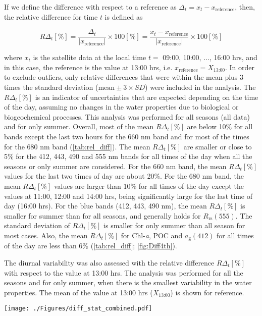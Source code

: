 \documentclass[remotesensing,article,submit,moreauthors,pdftex,10pt,a4paper]{Definitions/mdpi}
\begin{document}
If we define the difference with respect to a reference as $\Delta_t=x_t-x_\text{reference}$, then, the relative difference for time $t$ is defined as
\begin{linenomath*}
\begin{equation}
	R\Delta_t[\%] = \frac{\Delta_t}{|x_\text{reference}|} \times 100[\%] = \frac{x_t-x_\text{reference}}{|x_\text{reference}|}
	\times 100[\%]
\end{equation}
\end{linenomath*}
where $x_t$ is the satellite data at the local time $t =$ 09:00, 10:00, $\dots$, 16:00 hrs, and in this case, the reference is the value at 13:00 hrs, i.e. $x_\text{reference} = X_\text{13:00}$. In order to exclude outliers, only relative differences that were within the mean plus 3 times the standard deviation ($\text{mean}\pm3\times SD$) were included in the analysis. The $R\Delta_t[\%]$ is an indicator of uncertainties that are expected depending on the time of the day, assuming no changes in the water properties due to biological or biogeochemical processes. This analysis was performed for all seasons (all data) and for only summer. Overall, most of the mean $R\Delta_t[\%]$ are below 10\% for all bands except the last two hours for the 660 nm band and for most of the times for the 680 nm band (\autoref{tab:rel_diff}). The mean $R\Delta_t[\%]$ are smaller or close to 5\% for the 412, 443, 490 and 555 nm bands for all times of the day when all the seasons or only summer are considered. For the 660 nm band, the mean $R\Delta_t[\%]$ values for the last two times of day are about 20\%. For the 680 nm band, the mean $R\Delta_t[\%]$ values are larger than 10\% for all times of the day except the values at 11:00, 12:00 and 14:00 hrs, being significantly large for the last time of day (16:00 hrs). For the blue bands (412, 443, 490 nm), the mean $R\Delta_t[\%]$ is smaller for summer than for all seasons, and generally holds for $R_\text{rs}(555)$. The standard deviation of $R\Delta_t[\%]$ is smaller for only summer than all season for most cases. Also, the mean $R\Delta_t[\%]$ for Chl-{\it a}, POC and $a_\text{g}(412)$ for all times of the day are less than 6\%  (\autoref{tab:rel_diff}; \autoref{fig:Diff4th}). 



  \begin{table}[htbp!]
  \caption{The diurnal variability was also assessed with the relative difference $R\Delta_t[\%]$ with respect to the value at 13:00 hrs. The analysis was performed for all the seasons and for only summer, when there is the smallest variability in the water properties. The mean of the value at 13:00 hrs ($\overline{X}_\text{13:00}$) is shown for reference. \label{tab:rel_diff} } 
  \centering
  \texttt{[image: ./Figures/diff\_stat\_combined.pdf]}
  \end{table}
\end{document}
